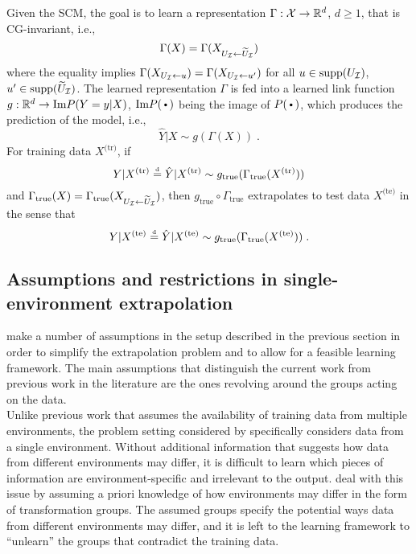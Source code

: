 Given the SCM, the goal is to learn a representation $\Gamma:\mathcal{X}\rightarrow\mathbb{R}^d$, $d\geq 1$, that is CG-invariant, i.e.,
\[
\Gamma(X) = \Gamma(X_{U_{\mathcal{I}}\leftarrow\widetilde{U}_{\mathcal{I}}})
\]
where the equality implies $\Gamma(X_{U_{\mathcal{I}}\leftarrow u})=\Gamma(X_{U_{\mathcal{I}}\leftarrow u'})$ for all $u\in\text{\rm supp}(U_{\mathcal{I}})$, $u'\in\text{\rm supp}(\widetilde{U}_{\mathcal{I}})$. The learned representation $\Gamma$ is fed into a learned link function $g:\mathbb{R}^d\rightarrow \text{Im} P(Y=y|X)$, $\text{Im} P(\argdot)$ being the image of $P(\argdot)$, which produces the prediction of the model, i.e.,
\[
\hat{Y}|X \sim g(\Gamma(X)) \;.
\]
For training data $X^\text{(tr)}$, if
\[
Y|X^\text{(tr)} \stackrel{\text{\rm\tiny d}}{=} \hat{Y}|X^\text{(tr)}\sim g_{\text{true}}(\Gamma_{\text{true}}(X^\text{(tr)}))
\]
and $\Gamma_\text{true}(X) = \Gamma_\text{true}(X_{U_{\mathcal{I}}\leftarrow\widetilde{U}_{\mathcal{I}}})$, then $g_\text{true}\circ\Gamma_\text{true}$ extrapolates to test data $X^\text{(te)}$ in the sense that
\[
Y|X^\text{(te)} \stackrel{\text{\rm\tiny d}}{=} \hat{Y}|X^\text{(te)}\sim g_{\text{true}}(\Gamma_{\text{true}}(X^\text{(te)})) \;.
\]


\subsection{Assumptions and restrictions in single-environment extrapolation}

\textcite{Mouli:2021} make a number of assumptions in the setup described in the previous section in order to simplify the extrapolation problem and to allow for a feasible learning framework. The main assumptions that distinguish the current work from previous work in the literature are the ones revolving around the groups acting on the data.
\\

Unlike previous work that assumes the availability of training data from multiple environments, the problem setting considered by \citeauthor{Mouli:2021} specifically considers data from a single environment. Without additional information that suggests how data from different environments may differ, it is difficult to learn which pieces of information are environment-specific and irrelevant to the output. \citeauthor{Mouli:2021} deal with this issue by assuming a priori knowledge of how environments may differ in the form of transformation groups. The assumed groups specify the potential ways data from different environments may differ, and it is left to the learning framework to ``unlearn'' the groups that contradict the training data.
\\

